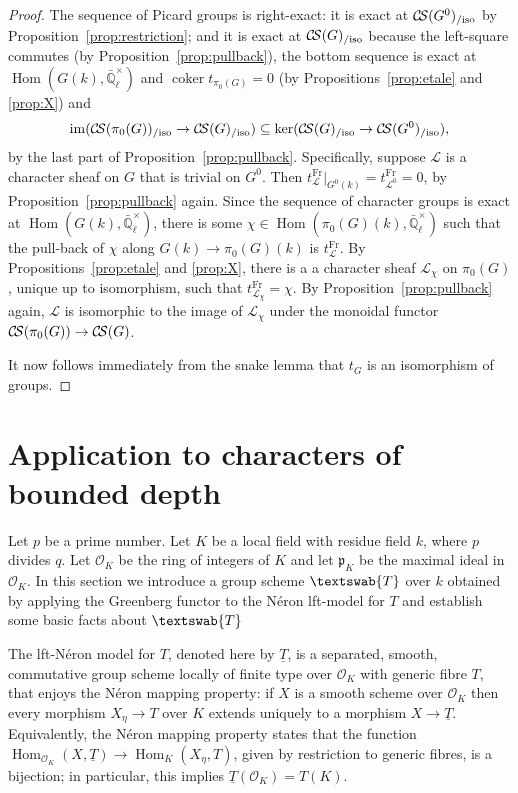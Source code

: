 \documentclass[11pt]{amsart}
\theoremstyle{plain}
\theoremstyle{definition}
\theoremstyle{remark}
\newcommand{\EE}{\mathbb{\bar Q}_\ell}
\newcommand{\OK}{\mathcal{O}_K}
\newcommand{\pK}{\mathfrak{p}_K}
\newcommand{\Fq}{k}
\newcommand{\Frob}{{\operatorname{Fr}}}
\DeclareMathOperator{\Hom}{Hom}
\DeclareMathOperator{\coker}{coker}
\newcommand{\GN}[1]{\textswab{#1}}
\newcommand{\TT}{\underline{T}}
\newcommand{\cs}[1]{{\mathcal{#1}}}
\newcommand{\CS}{{\mathcal{C\hskip-1.8pt S}}}
\newcommand{\image}{{\operatorname{im}}}
\begin{document}
\begin{proof}
  The sequence of Picard groups is right-exact: it is exact at
  $\CS(G^0)_{/\text{iso}}$ by Proposition~\ref{prop:restriction}; and
  it is exact at $\CS(G)_{/\text{iso}}$ because the left-square
  commutes (by Proposition~\ref{prop:pullback}), the bottom sequence
  is exact at $\Hom(G(\Fq),\EE^\times)$ and $\coker t_{\pi_0(G)} =0$
  (by Propositions~\ref{prop:etale} and \ref{prop:X}) and
  \[
  \image(\CS(\pi_0(G))_{/\text{iso}} \to \CS(G)_{/\text{iso}}) \subseteq \ker(\CS(G)_{/\text{iso}} \to \CS(G^0)_{/\text{iso}}),
  \]
  by the last part of Proposition~\ref{prop:pullback}. Specifically,
  suppose $\cs{L}$ is a character sheaf on $G$ that is trivial on
  $G^0$. Then $t^\Frob_\cs{L}\vert_{G^0(\Fq)} = t^\Frob_{\cs{L}^0} =0$,
  by Proposition~\ref{prop:pullback} again. Since the sequence of
  character groups is exact at $\Hom(G(\Fq),\EE^\times)$, there is
  some $\chi \in \Hom(\pi_0(G)(\Fq),\EE^\times)$ such that the
  pull-back of $\chi$ along $G(\Fq)\to \pi_0(G)(\Fq)$ is
  $t^\Frob_\cs{L}$. By Propositions~\ref{prop:etale} and \ref{prop:X},
  there is a a character sheaf $\cs{L}_\chi$ on $\pi_0(G)$, unique up
  to isomorphism, such that $t^\Frob_{\cs{L}_\chi} = \chi$. By
  Proposition~\ref{prop:pullback} again, $\cs{L}$ is isomorphic to the
  image of $\cs{L}_\chi$ under the monoidal functor $\CS(\pi_0(G)) \to \CS(G)$.

  It now follows immediately from the snake lemma that $t_{G}$ is an
  isomorphism of groups.
\end{proof}

\section{Application to characters of bounded depth}

%
Let $p$ be a prime number. Let $K$ be a local field with residue field
$\Fq$, where $p$ divides $q$. Let $\OK$ be the ring of integers of $K$
and let $\pK$ be the maximal ideal in $\OK$.
%
In this section we introduce a group scheme $\GN{T}$ over $\Fq$
obtained by applying the Greenberg functor to the N\'eron lft-model
for $T$ and establish some basic facts about $\GN{T}$


The lft-N\'eron model for $T$, denoted here by $\TT$, is a separated,
smooth, commutative group scheme locally of finite type over $\OK$
with generic fibre $T$, that enjoys the N\'eron mapping property: if
$X$ is a smooth scheme over $\OK$ then every morphism $X_\eta \to T$
over $K$ extends uniquely to a morphism $X \to \TT$. Equivalently, the
N\'eron mapping property states that the function
$\Hom_{\OK} (X,\TT) \to \Hom_K(X_\eta,T)$, given by restriction to
generic fibres, is a bijection; in particular, this implies $\TT(\OK) = T(K)$.
\end{document}
